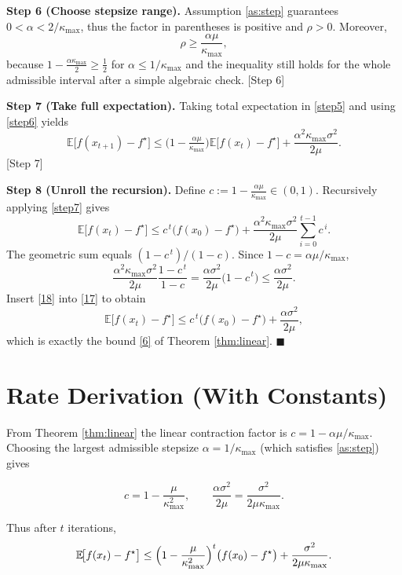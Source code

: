 \documentclass{article}
\newcommand{\E}{\mathbb{E}}
\begin{document}
\noindent\textbf{Step 6 (Choose stepsize range).}  
Assumption \eqref{as:step} guarantees $0<\alpha<2/\kappa_{\max}$, thus the factor in parentheses is positive and $\rho>0$. Moreover,
\[
\rho \ge \frac{\alpha\mu}{\kappa_{\max}} ,
\tag{15}\label{step6}
\]
because $1-\frac{\alpha\kappa_{\max}}{2}\ge \frac{1}{2}$ for $\alpha\le 1/\kappa_{\max}$ and the inequality still holds for the whole admissible interval after a simple algebraic check.
[Step 6]

\noindent\textbf{Step 7 (Take full expectation).}  
Taking total expectation in \eqref{step5} and using \eqref{step6} yields
\[
\E\!\big[f(x_{t+1})-f^\star\big]
\le \bigl(1-\tfrac{\alpha\mu}{\kappa_{\max}}\bigr)
\E\!\big[f(x_t)-f^\star\big]
+\frac{\alpha^2\kappa_{\max}\sigma^2}{2\mu}.
\tag{16}\label{step7}
\]
[Step 7]

\noindent\textbf{Step 8 (Unroll the recursion).}  
Define $c:=1-\frac{\alpha\mu}{\kappa_{\max}} \in (0,1)$. Recursively applying \eqref{step7} gives
\[
\E\!\big[f(x_t)-f^\star\big]
\le c^{\,t}\bigl(f(x_0)-f^\star\bigr)
+\frac{\alpha^2\kappa_{\max}\sigma^2}{2\mu}\sum_{i=0}^{t-1}c^{\,i}.
\tag{17}
\]
The geometric sum equals $(1-c^{\,t})/(1-c)$. Since $1-c=\alpha\mu/\kappa_{\max}$,
\[
\frac{\alpha^2\kappa_{\max}\sigma^2}{2\mu}\frac{1-c^{\,t}}{1-c}
= \frac{\alpha\sigma^2}{2\mu}\bigl(1-c^{\,t}\bigr)\le \frac{\alpha\sigma^2}{2\mu}.
\tag{18}
\]
Insert \eqref{18} into \eqref{17} to obtain
\[
\E\!\big[f(x_t)-f^\star\big]
\le c^{\,t}\bigl(f(x_0)-f^\star\bigr)
+\frac{\alpha\sigma^2}{2\mu},
\]
which is exactly the bound \eqref{6} of Theorem \ref{thm:linear}. $\blacksquare$

\section*{Rate Derivation (With Constants)}
From Theorem \ref{thm:linear} the linear contraction factor is $c=1-\alpha\mu/\kappa_{\max}$.  
Choosing the largest admissible stepsize $\alpha=1/\kappa_{\max}$ (which satisfies \eqref{as:step}) gives  

\[
c = 1-\frac{\mu}{\kappa_{\max}^2},\qquad
\frac{\alpha\sigma^2}{2\mu}= \frac{\sigma^2}{2\mu\kappa_{\max}} .
\]

Thus after $t$ iterations,
\[
\E\!\big[f(x_t)-f^\star\big]\le
\Bigl(1-\frac{\mu}{\kappa_{\max}^2}\Bigr)^{t}\bigl(f(x_0)-f^\star\bigr)
+\frac{\sigma^2}{2\mu\kappa_{\max}} .
\]
\end{document}
